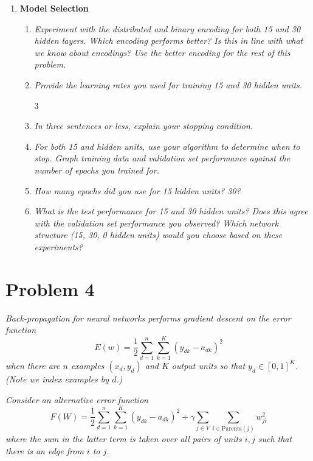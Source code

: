\documentclass{article}
\begin{document}
\begin{enumerate}
  \item \textbf{Model Selection}
    \begin{enumerate}
    \item \textit{Experiment with the distributed and binary encoding
      for both 15 and 30 hidden layers. Which encoding performs
      better? Is this in line with what we know about encodings? Use
      the better encoding for the rest of this problem.}

    \item \textit{Provide the learning rates you used for training 15
      and 30 hidden units.}

      \setcounter{enumii}3

    \item \textit{In three sentences or less, explain your stopping
      condition.}

    \item \textit{For both 15 and hidden units, use your algorithm to
      determine when to stop.  Graph training data and validation set
      performance against the number of epochs you trained for.}

    \item \textit{How many epochs did you use for 15 hidden units?
      30?}

    \item \textit{What is the test performance for 15 and 30 hidden
      units? Does this agree with the validation set performance you
      observed? Which network structure (15, 30, 0 hidden units) would
      you choose based on these experiments?}

    \end{enumerate}


  \end{enumerate}

  \section*{Problem 4}
  \textit{Back-propagation for neural networks performs gradient
    descent on the error function}
  \[E(w)=\frac{1}{2}\sum_{d=1}^n\sum_{k=1}^K(y_{dk}-a_{dk})^2\]
  \textit{when there are $n$ examples $(x_d,y_d)$ and $K$ output units
    so that $y_d\in [0,1]^K$. (Note we index examples by $d$.)}

  \textit{Consider an alternative error function}
  \[F(W)=\frac12\sum_{d=1}^n\sum_{k=1}^K(y_{dk}-a_{dk})^2+\gamma\sum_{j\in V}\sum_{i\in\text{Parents}(j)}w_{ji}^2\]
  \textit{where the sum in the latter term is taken over all pairs of
    units $i,j$ such that there is an edge from $i$ to $j$.}
\end{document}

